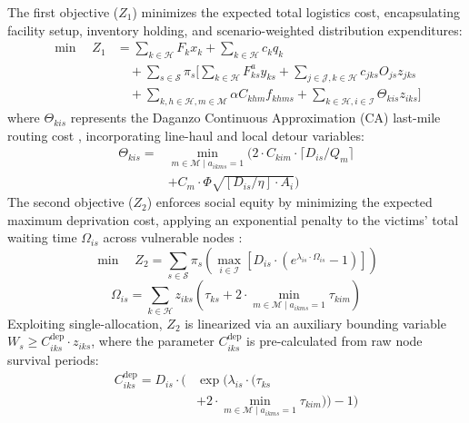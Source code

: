 \documentclass[conference]{IEEEtran}
\begin{document}
The first objective ($Z_1$) minimizes the expected total logistics cost, encapsulating facility setup, inventory holding, and scenario-weighted distribution expenditures:
\begin{equation} \label{eq:obj1}
\begin{split}
\min \quad Z_1 &= \sum_{k \in \mathcal{H}} F_k x_k + \sum_{k \in \mathcal{H}} c_k q_k \\
&\quad + \sum_{s \in \mathcal{S}} \pi_s \Bigg[ \sum_{k \in \mathcal{H}} F_{ks}^a y_{ks} + \sum_{j \in \mathcal{J}, k \in \mathcal{H}} c_{jks} O_{js} z_{jks} \\
&\quad + \sum_{k,h \in \mathcal{H}, m \in \mathcal{M}} \alpha C_{khm} f_{khms} + \sum_{k \in \mathcal{H}, i \in \mathcal{I}} \Theta_{kis} z_{iks} \Bigg]
\end{split}
\end{equation}
where $\Theta_{kis}$ represents the Daganzo Continuous Approximation (CA) last-mile routing cost \cite{daganzo2005logistics}, incorporating line-haul and local detour variables:
\begin{equation} \label{eq:daganzo_theta}
\begin{split}
    \Theta_{kis} = & \min_{m \in \mathcal{M} \mid a_{ikms}=1} \Bigg( 2 \cdot C_{kim} \cdot \lceil D_{is}/Q_m \rceil \\
    & + C_{m} \cdot \Phi \sqrt{[D_{is}/\eta]\cdot A_i} \Bigg)
\end{split}
\end{equation}
The second objective ($Z_2$) enforces social equity by minimizing the expected maximum deprivation cost, applying an exponential penalty to the victims' total waiting time $\Omega_{is}$ across vulnerable nodes \cite{holguin2013appropriate}:
\begin{equation} \label{eq:obj2}
    \min \quad Z_2 = \sum_{s \in \mathcal{S}} \pi_s \left( \max_{i \in \mathcal{I}} \left[ D_{is} \cdot \left( e^{\lambda_{is} \cdot \Omega_{is}} - 1 \right) \right] \right)
\end{equation}
\begin{equation*} \label{eq:waiting_time}
    \Omega_{is} = \sum_{k \in \mathcal{H}} z_{iks} \left( \tau_{ks} + 2 \cdot \min_{m \in \mathcal{M} \mid a_{ikms}=1} \tau_{kim} \right)
\end{equation*}
Exploiting single-allocation, $Z_2$ is linearized via an auxiliary bounding variable $W_s \ge C^{\text{dep}}_{iks} \cdot z_{iks}$, where the parameter $C^{\text{dep}}_{iks}$ is pre-calculated from raw node survival periods:
\begin{equation} \label{eq:deprivation_cost}
\begin{split}
    C^{\text{dep}}_{iks} = D_{is} \cdot \Bigg( & \exp\Big(\lambda_{is} \cdot \big(\tau_{ks} \\
    & + 2 \cdot \min_{m \in \mathcal{M} \mid a_{ikms}=1} \tau_{kim}\big)\Big) - 1 \Bigg)
\end{split}
\end{equation}
\end{document}
